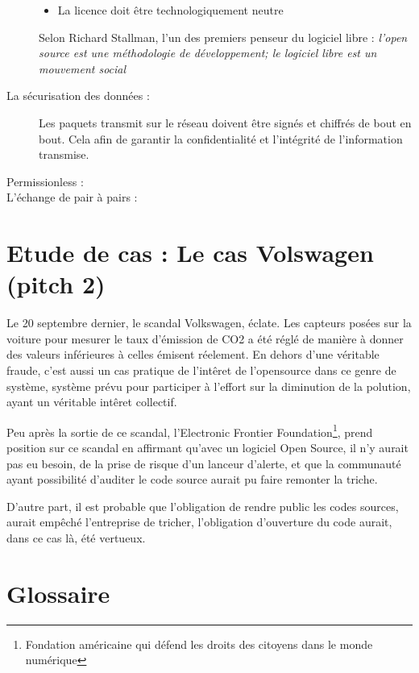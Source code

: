 \documentclass[a4paper,12pt]{article}
\begin{document}
\begin{description}
\begin{itemize}
			\item La licence doit être technologiquement neutre
		\end{itemize}	
Selon Richard Stallman, l'un des premiers penseur du logiciel libre : \textit{l'open source est une méthodologie de développement; le logiciel libre est un mouvement social}
		\item [La sécurisation des données : ] Les paquets transmit sur le réseau doivent être signés et chiffrés de bout en bout. Cela afin de garantir la confidentialité et l'intégrité de l'information transmise. 
		\item [Permissionless : ]
		\item [L'échange de pair à pairs : ]
	\end{description}

\section{Etude de cas : Le cas Volswagen (pitch 2)}
Le 20 septembre dernier, le scandal Volkswagen, éclate. Les capteurs posées sur la voiture pour mesurer le taux d'émission de CO2 a été réglé de manière à donner des valeurs inférieures à celles émisent réelement. En dehors d'une véritable fraude, c'est aussi un cas pratique de l'intêret de l'opensource dans ce genre de système, système prévu pour participer à l'effort sur la diminution de la polution, ayant un véritable intêret collectif. 

Peu après la sortie de ce scandal, l'Electronic Frontier Foundation\footnote{Fondation américaine qui défend les droits des citoyens dans le monde numérique}, prend position sur ce scandal en affirmant qu'avec un logiciel Open Source, il n'y aurait pas eu besoin, de la prise de risque d'un lanceur d'alerte, et que la communauté ayant possibilité d'auditer le code source aurait pu faire remonter la triche.

D'autre part, il est probable que l'obligation de rendre public les codes sources, aurait empêché l'entreprise de tricher, l'obligation d'ouverture du code aurait, dans ce cas là, été vertueux. 
\newpage
\section*{Glossaire}
\end{document}
